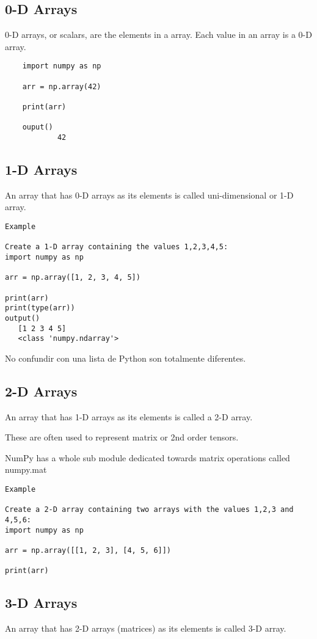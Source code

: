 \subsection{0-D Arrays}
0-D arrays, or scalars, are the elements in a array. Each value in an array is a 0-D array.

\begin{verbatim}
	import numpy as np
	
	arr = np.array(42)
	
	print(arr) 
	
	ouput()
			42
\end{verbatim}


\subsection{1-D Arrays}
An array that has 0-D arrays as its elements is called uni-dimensional or 1-D array.

\begin{verbatim}
Example

Create a 1-D array containing the values 1,2,3,4,5:
import numpy as np

arr = np.array([1, 2, 3, 4, 5])

print(arr) 
print(type(arr)) 
output()
   [1 2 3 4 5]
   <class 'numpy.ndarray'>
\end{verbatim}
No confundir con una lista de Python son totalmente diferentes.


\subsection{2-D Arrays}
An array that has 1-D arrays as its elements is called a 2-D array.

These are often used to represent matrix or 2nd order tensors.

NumPy has a whole sub module dedicated towards matrix operations called numpy.mat

\begin{verbatim}
Example

Create a 2-D array containing two arrays with the values 1,2,3 and 4,5,6:
import numpy as np

arr = np.array([[1, 2, 3], [4, 5, 6]])

print(arr) 
\end{verbatim}




\subsection{3-D Arrays}
An array that has 2-D arrays (matrices) as its elements is called 3-D array.

